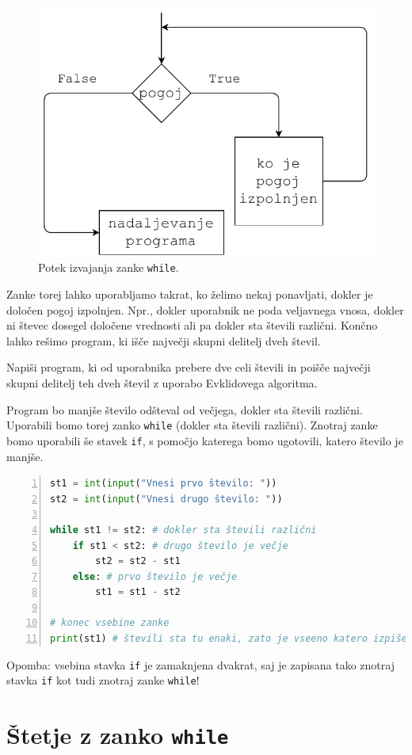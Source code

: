 \begin{figure}
    \centering
    \includegraphics[width=0.5\linewidth]{img/while1.pdf}
    \caption{Potek izvajanja zanke \texttt{while}.}
    \label{img:while1}
\end{figure}

Zanke torej lahko uporabljamo takrat, ko želimo nekaj ponavljati, dokler je določen pogoj izpolnjen. Npr., dokler uporabnik ne poda veljavnega vnosa, dokler ni števec dosegel določene vrednosti ali pa dokler sta števili različni. Končno lahko rešimo program, ki išče največji skupni delitelj dveh števil.
\begin{zgled}
Napiši program, ki od uporabnika prebere dve celi števili in poišče največji skupni delitelj teh dveh števil z uporabo Evklidovega algoritma.
\end{zgled}
\begin{resitev}
Program bo manjše število odšteval od večjega, dokler sta števili različni. Uporabili bomo torej zanko \texttt{while} (dokler sta števili različni).  Znotraj zanke bomo uporabili še stavek \texttt{if}, s pomočjo katerega bomo ugotovili, katero število je manjše. 
\begin{lstlisting}[language=Python, showstringspaces=false,numbers=left]
st1 = int(input("Vnesi prvo število: "))
st2 = int(input("Vnesi drugo število: "))

while st1 != st2: # dokler sta števili različni
    if st1 < st2: # drugo število je večje
        st2 = st2 - st1
    else: # prvo število je večje
        st1 = st1 - st2

# konec vsebine zanke 
print(st1) # števili sta tu enaki, zato je vseeno katero izpišem
\end{lstlisting}
Opomba: vsebina stavka \texttt{if} je zamaknjena dvakrat, saj je zapisana tako znotraj stavka \texttt{if} kot tudi znotraj zanke \texttt{while}!
\end{resitev}

\section{Štetje z zanko \texttt{while}}


